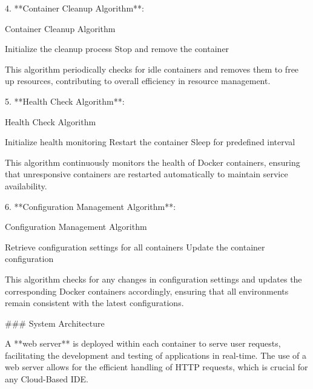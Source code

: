 \documentclass[12pt,a4paper,final]{report}
\begin{document}
4. **Container Cleanup Algorithm**:
   \begin{algorithm}[H]
   \caption{Container Cleanup Algorithm}
   \begin{algorithmic}[1]
       \STATE Initialize the cleanup process
               \STATE Stop and remove the container
           \ENDIF
       \ENDFOR
   \end{algorithmic}
   \end{algorithm}

   This algorithm periodically checks for idle containers and removes them to free up resources, contributing to overall efficiency in resource management.

5. **Health Check Algorithm**:
   \begin{algorithm}[H]
   \caption{Health Check Algorithm}
   \begin{algorithmic}[1]
       \STATE Initialize health monitoring
                   \STATE Restart the container
               \ENDIF
           \ENDFOR
           \STATE Sleep for predefined interval
       \ENDWHILE
   \end{algorithmic}
   \end{algorithm}

   This algorithm continuously monitors the health of Docker containers, ensuring that unresponsive containers are restarted automatically to maintain service availability.

6. **Configuration Management Algorithm**:
   \begin{algorithm}[H]
   \caption{Configuration Management Algorithm}
   \begin{algorithmic}[1]
       \STATE Retrieve configuration settings for all containers
               \STATE Update the container configuration
           \ENDIF
       \ENDFOR
   \end{algorithmic}
   \end{algorithm}

   This algorithm checks for any changes in configuration settings and updates the corresponding Docker containers accordingly, ensuring that all environments remain consistent with the latest configurations.

### System Architecture

A **web server** is deployed within each container to serve user requests, facilitating the development and testing of applications in real-time. The use of a web server allows for the efficient handling of HTTP requests, which is crucial for any Cloud-Based IDE.
\end{document}
